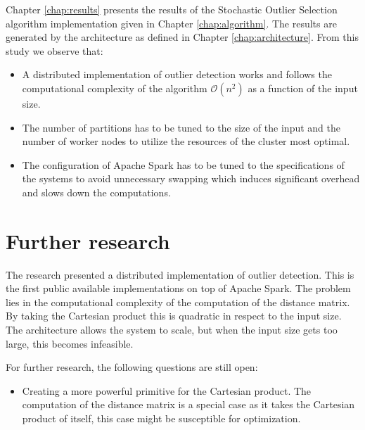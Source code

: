 Chapter \ref{chap:results} presents the results of the Stochastic Outlier Selection algorithm implementation given in Chapter \ref{chap:algorithm}. The results are generated by the architecture as defined in Chapter \ref{chap:architecture}. From this study we observe that:

\begin{itemize} 
    \item A distributed implementation of outlier detection works and follows the computational complexity of the algorithm $\mathcal{O}(n^{2})$ as a function of the input size.
    \item The number of partitions has to be tuned to the size of the input and the number of worker nodes to utilize the resources of the cluster most optimal.
    \item The configuration of Apache Spark has to be tuned to the specifications of the systems to avoid unnecessary swapping which induces significant overhead and slows down the computations.
\end{itemize}

\section{Further research \label{sec:futherResearch}}
The research presented a distributed implementation of outlier detection. This is the first public available implementations on top of Apache Spark. The problem lies in the computational complexity of the computation of the distance matrix. By taking the Cartesian product this is quadratic in respect to the input size. The architecture allows the system to scale, but when the input size gets too large, this becomes infeasible.

For further research, the following questions are still open:
\begin{itemize}
    \item Creating a more powerful primitive for the Cartesian product. The computation of the distance matrix is a special case as it takes the Cartesian product of itself, this case might be susceptible for optimization.
\end{itemize}




